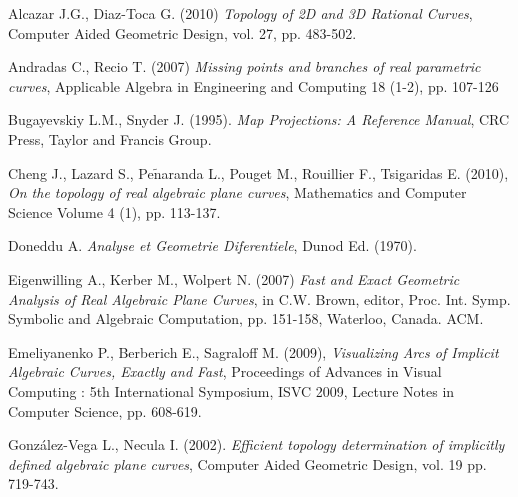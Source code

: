 \documentclass{elsart}
\begin{document}
\begin{thebibliography}{56}













 Alcazar J.G., Diaz-Toca G. (2010) {\it Topology of 2D and 3D Rational Curves}, Computer Aided Geometric Design, vol. 27, pp.
483-502.



 Andradas C., Recio T. (2007) {\it Missing points and branches of real parametric curves}, Applicable Algebra in
Engineering and Computing 18 (1-2), pp. 107-126





 Bugayevskiy L.M., Snyder J. (1995). {\it Map Projections: A Reference Manual}, CRC Press, Taylor and Francis Group.





 Cheng J., Lazard S., Pe$\tilde{\mbox{n}}$aranda L., Pouget M., Rouillier F., Tsigaridas E. (2010), {\it On the topology of real algebraic plane curves}, Mathematics and Computer Science Volume 4 (1), pp. 113-137.



 Doneddu A. {\it Analyse et Geometrie Diferentiele}, Dunod Ed. (1970).



 Eigenwilling A., Kerber M., Wolpert N. (2007) {\it Fast and Exact Geometric Analysis of Real Algebraic Plane Curves}, in C.W. Brown, editor, Proc. Int. Symp. Symbolic and Algebraic Computation, pp. 151-158, Waterloo, Canada. ACM.

     Emeliyanenko P., Berberich E., Sagraloff M. (2009), {\it Visualizing Arcs of Implicit Algebraic Curves, Exactly and Fast}, Proceedings of
Advances in Visual Computing : 5th International Symposium, ISVC 2009, Lecture Notes in Computer Science, pp. 608-619.










 Gonz\'alez-Vega L., Necula I. (2002).
{\it Efficient topology determination of implicitly defined
algebraic plane curves}, Computer Aided Geometric Design, vol. 19
pp. 719-743.


\end{thebibliography}
\end{document}
